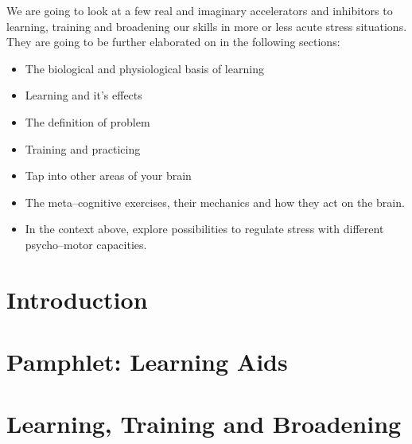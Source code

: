 \documentclass[../main.tex]{subfiles}
\begin{document}
We are going to look at a few real and imaginary accelerators and inhibitors to learning, training and broadening our skills in more or less acute stress situations. They are going to be further elaborated on in the following sections:

\begin{itemize}
\item The biological and physiological basis of learning
\item Learning and it's effects
\item The definition of problem
\item Training and practicing
\item Tap into other areas of your brain
\item The meta--cognitive exercises, their mechanics and how they act on the brain.
  \item In the context above, explore possibilities to regulate stress with different psycho--motor capacities.
\end{itemize}



\chapter{Introduction}

\chapter{Pamphlet: Learning Aids}

\chapter{Learning, Training and Broadening}

\end{document}
